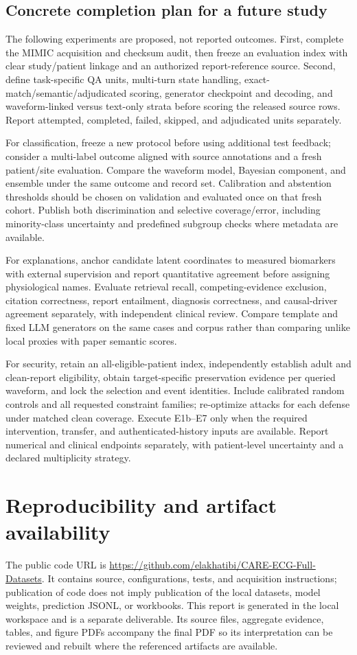 \subsection{Concrete completion plan for a future study}
The following experiments are proposed, not reported outcomes. First, complete the MIMIC acquisition and checksum audit, then freeze an evaluation index with clear study/patient linkage and an authorized report-reference source. Second, define task-specific QA units, multi-turn state handling, exact-match/semantic/adjudicated scoring, generator checkpoint and decoding, and waveform-linked versus text-only strata before scoring the released source rows. Report attempted, completed, failed, skipped, and adjudicated units separately.

For classification, freeze a new protocol before using additional test feedback; consider a multi-label outcome aligned with source annotations and a fresh patient/site evaluation. Compare the waveform model, Bayesian component, and ensemble under the same outcome and record set. Calibration and abstention thresholds should be chosen on validation and evaluated once on that fresh cohort. Publish both discrimination and selective coverage/error, including minority-class uncertainty and predefined subgroup checks where metadata are available.

For explanations, anchor candidate latent coordinates to measured biomarkers with external supervision and report quantitative agreement before assigning physiological names. Evaluate retrieval recall, competing-evidence exclusion, citation correctness, report entailment, diagnosis correctness, and causal-driver agreement separately, with independent clinical review. Compare template and fixed LLM generators on the same cases and corpus rather than comparing unlike local proxies with paper semantic scores.

For security, retain an all-eligible-patient index, independently establish adult and clean-report eligibility, obtain target-specific preservation evidence per queried waveform, and lock the selection and event identities. Include calibrated random controls and all requested constraint families; re-optimize attacks for each defense under matched clean coverage. Execute E1b--E7 only when the required intervention, transfer, and authenticated-history inputs are available. Report numerical and clinical endpoints separately, with patient-level uncertainty and a declared multiplicity strategy.

\section{Reproducibility and artifact availability}
\label{sec:reproducibility}
The public code URL is \url{https://github.com/elakhatibi/CARE-ECG-Full-Datasets}. It contains source, configurations, tests, and acquisition instructions; publication of code does not imply publication of the local datasets, model weights, prediction JSONL, or workbooks. This report is generated in the local workspace and is a separate deliverable. Its source files, aggregate evidence, tables, and figure PDFs accompany the final PDF so its interpretation can be reviewed and rebuilt where the referenced artifacts are available.

